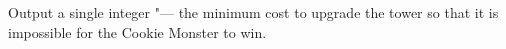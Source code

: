 Output a single integer "--- the minimum cost to upgrade the tower so that it is impossible for the Cookie Monster to win.
